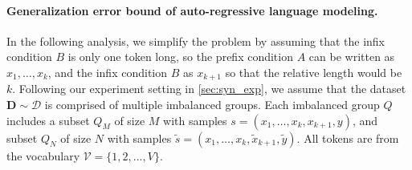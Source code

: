 \paragraph{Generalization error bound of auto-regressive language modeling.}
In the following analysis, we simplify the problem by assuming that the infix condition $B$ is only one token long, so the prefix condition $A$ can be written as  ${x}_1, \dots, {x}_k$, and the infix condition $B$ as ${x}_{k+1}$ so that the relative length would be $k$.
Following our experiment setting in \autoref{sec:syn_exp}, we assume that the dataset $\mathbf{D} \sim \mathcal{D}$ is comprised of multiple imbalanced groups. 
Each imbalanced group ${Q}$ includes a subset $Q_M$ of size $M$ with samples $s = ({x}_1, \dots, {x}_k, {x}_{k+1}, y)$, and subset $Q_N$ of size $N$  with samples $\tilde{s} = ({x}_1, \dots, {x}_k, \tilde{{x}}_{k+1}, \tilde{y})$. 
All tokens 
are from the vocabulary $\mathcal{V}=\{1, 2, ..., V\}$.



